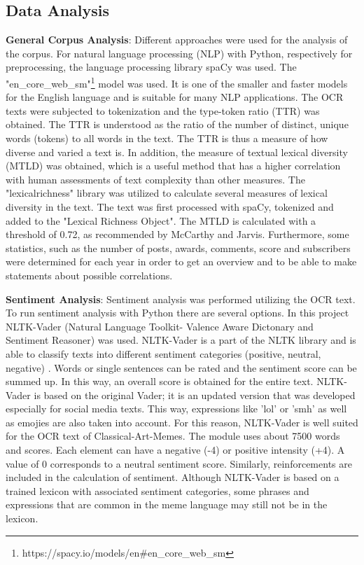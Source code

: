 \documentclass[11pt,a4paper]{article}
\begin{document}
 \subsection{Data Analysis}
 \textbf{General Corpus Analysis}:
 Different approaches were used for the analysis of the corpus. For natural language processing (NLP) with Python, respectively for preprocessing, the language processing library spaCy \cite{Luber2020}
 was used. The "en\_core\_web\_sm"\footnote{https://spacy.io/models/en#en\_core\_web\_sm} model was used. It is one of the smaller and faster models for the English language and is suitable for many NLP applications. The OCR texts were subjected to tokenization and the type-token ratio (TTR) was obtained. The TTR is understood as the ratio of the number of distinct, unique words (tokens) to all words in the text. The TTR is thus a measure of how diverse and varied a text is.
 \cite{Wimmer2005}
In addition, the measure of textual lexical diversity (MTLD) was obtained, which is a useful method that has a higher correlation with human assessments of text complexity than other measures. The "lexicalrichness" library was utilized to calculate several measures of lexical diversity in the text. The text was first processed with spaCy, tokenized and added to the "Lexical Richness Object". The MTLD is calculated with a threshold of 0.72, as recommended by McCarthy and Jarvis.\cite{McCarthy2010}
Furthermore, some statistics, such as the number of posts, awards, comments, score and subscribers were determined for each year in order to get an overview and to be able to make statements about possible correlations.
 \par
 \textbf{Sentiment Analysis}: Sentiment analysis was performed utilizing the OCR text. To run sentiment analysis with Python there are several options. In this project NLTK-Vader (Natural Language Toolkit- Valence Aware Dictonary and Sentiment Reasoner) was used. NLTK-Vader is a part of the NLTK library and is able to classify texts into different sentiment categories (positive, neutral, negative) \cite{Ma2020}. Words or single sentences can be rated and the sentiment score can be summed up. In this way, an overall score is obtained for the entire text. NLTK-Vader is based on the original Vader; it is an updated version that was developed especially for social media texts. This way, expressions like 'lol' or 'smh' as well as emojies are also taken into account. For this reason, NLTK-Vader is well suited for the OCR text of Classical-Art-Memes. The module uses about 7500 words and scores. Each element can have a negative (-4) or positive intensity (+4). A value of 0 corresponds to a neutral sentiment score. Similarly, reinforcements are included in the calculation of sentiment. Although NLTK-Vader is based on a trained lexicon with associated sentiment categories, some phrases and expressions that are common in the meme language may still not be in the lexicon. 
\end{document}
